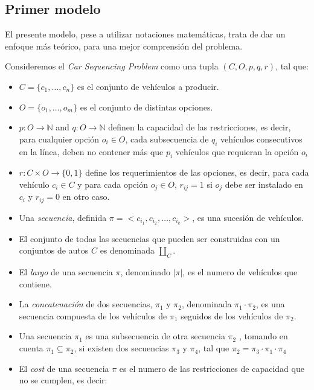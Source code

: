 \subsection{Primer modelo}
El presente modelo, pese a utilizar notaciones matemáticas, trata de dar un enfoque más teórico,
para una mejor comprensión del problema.

Consideremos el \emph{Car Sequencing Problem} como una tupla $(C,O,p,q,r)$, tal que:
\begin{itemize}
	\item $C=\{c_1,\ldots,c_n\}$ es el conjunto de vehículos a producir.
	\item $O=\{o_1,\ldots,o_m\}$ es el conjunto de distintas opciones.
	\item $p:O\rightarrow\mathbb{N}$ and $q:O\rightarrow\mathbb{N}$ definen la capacidad de las restricciones,
		es decir, para cualquier opción $o_i \in O$, cada subsecuencia de $q_i$ vehículos consecutivos en la línea,
		deben no contener más que $p_i$ vehículos que requieran la opción $o_i$
	\item $r:C\times O \rightarrow \{0,1\}$ define los requerimientos de las opciones, es decir, para cada vehículo
		$c_i \in C$ y para cada opción $o_j \in O$, $r_{ij} = 1$ si $o_j$ debe ser instalado en $c_i$ y $r_{ij} = 0$
		en otro caso.
\end{itemize}


\begin{itemize}
	\item Una \emph{secuencia}, definida $\pi =< c_{i_{1}}, c_{i_{2}}, \ldots, c_{i_{k}} >$, es una sucesión de vehículos.
	\item El conjunto de todas las secuencias que pueden ser construidas con un conjuntos de autos $C$ es denominada $\amalg_{C}$.
	\item El \emph{largo} de una secuencia $\pi$, denominado $|\pi|$, es el numero de vehículos que contiene.
	\item La \emph{concatenación} de dos secuencias, $\pi_1$ y $\pi_2$, denominada $\pi_1 \cdot \pi_2$, es una secuencia
		compuesta de los vehículos de $\pi_1$ seguidos de los vehículos de $\pi_2$.
	\item Una secuencia $\pi_1$ es una subsecuencia de otra secuencia $\pi_2$ , tomando en cuenta $\pi_1 \subseteq \pi_2$,
		si existen dos secuencias $\pi_3$ y $\pi_4$, tal que $\pi_2 = \pi_3 \cdot \pi_1 \cdot \pi_4$
	\item El \emph{cost} de una secuencia $\pi$ es el numero de las restricciones de capacidad que no se cumplen, es decir:
\end{itemize}

